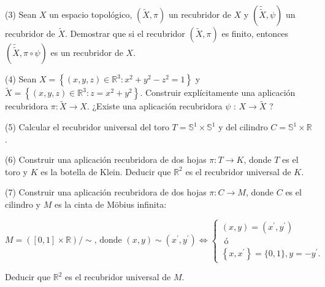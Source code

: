 \documentclass[
  a4paper,
  spanish,
  12pt,
]{scrartcl}
\begin{document}
\begin{ejer}
(3) Sean $X$ un espacio topológico, $(\widetilde{X}, \pi)$ un recubridor de $X$ y $(\widetilde{\widetilde{X}}, \psi)$ un recubridor de $\widetilde{X}$. Demostrar que si el recubridor $(\widetilde{X}, \pi)$ es finito, entonces $(\widetilde{\widetilde{X}}, \pi \circ \psi)$ es un recubridor de $X$.\\
\end{ejer}

\begin{ejer}
(4) Sean $X=\left\{(x, y, z) \in \mathbb{R}^{3}: x^{2}+y^{2}-z^{2}=1\right\}$ y $\widetilde{X}=\left\{(x, y, z) \in \mathbb{R}^{3}: z=x^{2}+y^{2}\right\}$. Construir explícitamente una aplicación recubridora $\pi: \widetilde{X} \rightarrow X$. ¿Existe una aplicación recubridora $\psi$ : $X \rightarrow \widetilde{X}$ ?\\
\end{ejer}

\begin{ejer}
(5) Calcular el recubridor universal del toro $T=\mathbb{S}^{1} \times \mathbb{S}^{1}$ y del cilindro $C=\mathbb{S}^{1} \times \mathbb{R}$.\\
\end{ejer}

\begin{ejer}
(6) Construir una aplicación recubridora de dos hojas $\pi: T \rightarrow K$, donde $T$ es el toro y $K$ es la botella de Klein. Deducir que $\mathbb{R}^{2}$ es el recubridor universal de $K$.\\
\end{ejer}

\begin{ejer}
(7) Construir una aplicación recubridora de dos hojas $\pi: C \rightarrow M$, donde $C$ es el cilindro y $M$ es la cinta de Möbius infinita:

$$
M=([0,1] \times \mathbb{R}) / \sim \text {, donde }(x, y) \sim\left(x^{\prime}, y^{\prime}\right) \Leftrightarrow\left\{\begin{array}{l}
(x, y)=\left(x^{\prime}, y^{\prime}\right) \\
\text { ó } \\
\left\{x, x^{\prime}\right\}=\{0,1\}, y=-y^{\prime} .
\end{array}\right.
$$


Deducir que $\mathbb{R}^{2}$ es el recubridor universal de $M$.\\
\end{ejer}
\end{document}
